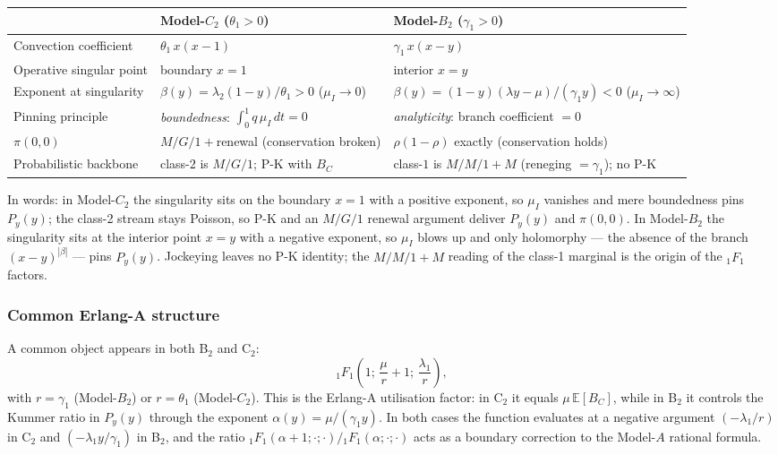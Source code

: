\begin{center}
\renewcommand{\arraystretch}{1.45}
\begin{tabular}{p{} p{} p{}}
\hline
 & \textbf{Model-$C_2$ ($\theta_1>0$)} & \textbf{Model-$B_2$ ($\gamma_1>0$)} \\
\hline
Convection coefficient
 & $\theta_1\,x(x-1)$
 & $\gamma_1\,x(x-y)$ \\
Operative singular point
 & boundary $x=1$
 & interior $x=y$ \\
Exponent at singularity
 & $\beta(y)=\lambda_2(1-y)/\theta_1>0$ \;($\mu_I\to0$)
 & $\beta(y)=(1-y)(\lambda y-\mu)/(\gamma_1 y)<0$ \;($\mu_I\to\infty$) \\
Pinning principle
 & \emph{boundedness}: $\int_0^1 q\,\mu_I\,dt=0$
 & \emph{analyticity}: branch coefficient $=0$ \\
$\pi(0,0)$
 & $M/G/1{+}$renewal (conservation broken)
 & $\rho(1-\rho)$ exactly (conservation holds) \\
Probabilistic backbone
 & class-$2$ is $M/G/1$; P-K with $B_C$
 & class-$1$ is $M/M/1{+}M$ (reneging $=\gamma_1$); no P-K \\
\hline
\end{tabular}
\end{center}

In words: in Model-$C_2$ the singularity sits on the boundary $x=1$ with a positive
exponent, so $\mu_I$ vanishes and mere boundedness pins $P_y(y)$; the class-2 stream stays
Poisson, so P-K and an $M/G/1$ renewal argument deliver $P_y(y)$ and $\pi(0,0)$. In
Model-$B_2$ the singularity sits at the interior point $x=y$ with a negative exponent, so
$\mu_I$ blows up and only holomorphy --- the absence of the branch $(x-y)^{|\beta|}$ --- pins
$P_y(y)$. Jockeying leaves no P-K identity; the $M/M/1{+}M$ reading of the class-1 marginal is
the origin of the ${}_1F_1$ factors.

\subsubsection*{Common Erlang-A structure}

A common object appears in both B$_2$ and C$_2$:
\begin{equation}
    {}_1F_1\!\left(1;\,\frac{\mu}{r}+1;\,\frac{\lambda_1}{r}\right),
    \label{eq:comp:1F1}
\end{equation}
with $r=\gamma_1$ (Model-$B_2$) or $r=\theta_1$ (Model-$C_2$).
This is the Erlang-A utilisation factor: in C$_2$ it equals $\mu\,\mathbb{E}[B_C]$, while in
B$_2$ it controls the Kummer ratio in $P_y(y)$ through the exponent $\alpha(y)=\mu/(\gamma_1 y)$.
In both cases the function evaluates at a negative argument
$(-\lambda_1/r)$ in C$_2$ and $(-\lambda_1 y/\gamma_1)$ in B$_2$, and the
ratio ${}_1F_1(\alpha+1;\cdot;\cdot)/{}_1F_1(\alpha;\cdot;\cdot)$ acts as a
boundary correction to the Model-$A$ rational formula.

